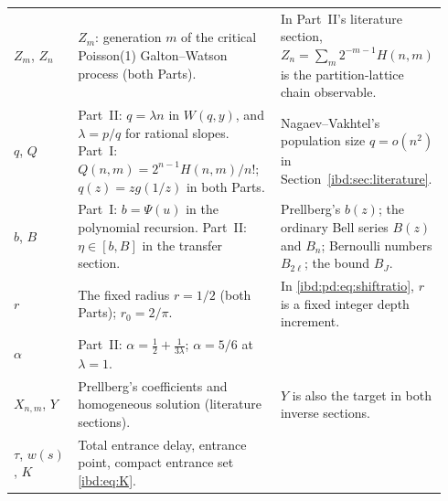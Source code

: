 \documentclass[11pt,letterpaper]{article}
\theoremstyle{remark}\newtheorem{remark}[theorem]{Remark}
\begin{document}
{\begin{longtable}{@{}>{\raggedright\arraybackslash}p{0.15\linewidth}>{\raggedright\arraybackslash}p{0.47\linewidth}>{\raggedright\arraybackslash}p{0.32\linewidth}@{}}
$Z_m$, $Z_n$ & $Z_m$: generation $m$ of the critical Poisson(1) Galton--Watson process (both Parts). & In Part~II's literature section, $Z_n=\sum_m2^{-m-1}H(n,m)$ is the partition-lattice chain observable.\\
$q$, $Q$ & Part~II: $q=\lambda n$ in $W(q,y)$, and $\lambda=p/q$ for rational slopes. Part~I: $Q(n,m)=2^{n-1}H(n,m)/n!$; $q(z)=zg(1/z)$ in both Parts. & Nagaev--Vakhtel's population size $q=o(n^2)$ in Section~\ref{ibd:sec:literature}.\\
$b$, $B$ & Part~I: $b=\Psi(u)$ in the polynomial recursion. Part~II: $\eta\in[b,B]$ in the transfer section. & Prellberg's $b(z)$; the ordinary Bell series $B(z)$ and $B_n$; Bernoulli numbers $B_{2\ell}$; the bound $B_J$.\\
$r$ & The fixed radius $r=1/2$ (both Parts); $r_0=2/\pi$. & In \eqref{ibd:pd:eq:shiftratio}, $r$ is a fixed integer depth increment.\\
$\alpha$ & Part~II: $\alpha=\frac12+\frac1{3\lambda}$; $\alpha=5/6$ at $\lambda=1$. & \\
$X_{n,m}$, $Y$ & Prellberg's coefficients and homogeneous solution (literature sections). & $Y$ is also the target in both inverse sections.\\
$\tau$, $w(s)$, $K$ & Total entrance delay, entrance point, compact entrance set \eqref{ibd:eq:K}. & \\
\end{longtable}}
\end{document}

